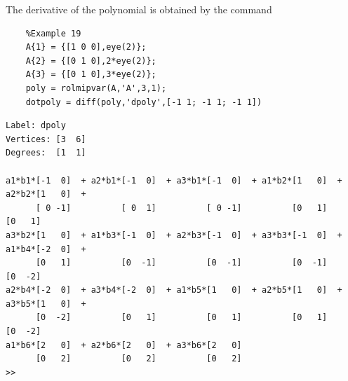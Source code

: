 \documentclass[english,11pt]{article}
\theoremstyle{break} \theorembodyfont{\small\rm}
\begin{document}
The derivative of the polynomial is obtained by the command

\vspace{0.5cm}%
\begin{minipage}{14.5cm}
\end{minipage}
\vspace{0.2cm}

\begin{minipage}{12.5cm}
	\begin{lstlisting}
	%Example 19
	A{1} = {[1 0 0],eye(2)};
	A{2} = {[0 1 0],2*eye(2)};
	A{3} = {[0 1 0],3*eye(2)};
	poly = rolmipvar(A,'A',3,1);
	dotpoly = diff(poly,'dpoly',[-1 1; -1 1; -1 1])
	\end{lstlisting}
\end{minipage}
\vspace{0.2cm}

\begin{minipage}{17.2cm}
	\begin{lstlisting}[rulecolor=\color{red}]
Label: dpoly
Vertices: [3  6]
Degrees:  [1  1]

a1*b1*[-1  0]  + a2*b1*[-1  0]  + a3*b1*[-1  0]  + a1*b2*[1   0]  + a2*b2*[1   0]  +
      [ 0 -1]          [ 0  1]          [ 0 -1]          [0   1]          [0   1]
a3*b2*[1   0]  + a1*b3*[-1  0]  + a2*b3*[-1  0]  + a3*b3*[-1  0]  + a1*b4*[-2  0]  +
      [0   1]          [0  -1]          [0  -1]          [0  -1]          [0  -2] 
a2*b4*[-2  0]  + a3*b4*[-2  0]  + a1*b5*[1   0]  + a2*b5*[1   0]  + a3*b5*[1   0]  +
      [0  -2]          [0   1]          [0   1]          [0   1]          [0  -2]
a1*b6*[2   0]  + a2*b6*[2   0]  + a3*b6*[2   0] 
      [0   2]          [0   2]          [0   2]
>> 	\end{lstlisting}
\end{minipage}
\vspace{0.2cm}
\end{document}
